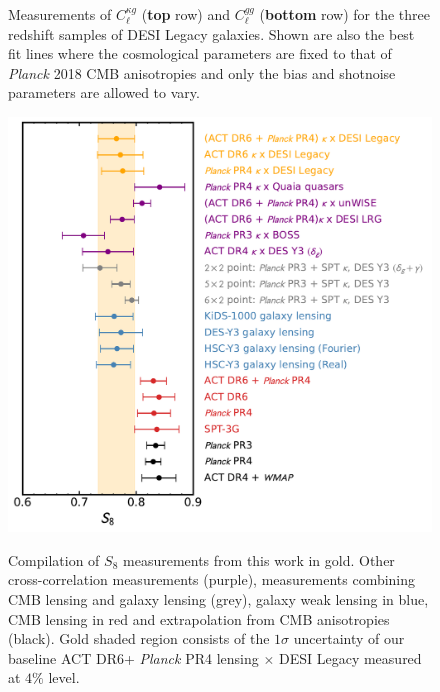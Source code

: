 \documentclass[twocolumn]{aastex631}
\begin{document}
{\begin{figure}
    \caption{Measurements of $C^{\kappa{g}}_\ell$ (\textbf{top} row) and  $C^{gg}_\ell$ (\textbf{bottom} row) for the three redshift samples of DESI Legacy galaxies. Shown are also the best fit lines where the cosmological parameters are fixed to that of \textit{Planck} 2018 CMB anisotropies and only the bias and shotnoise parameters are allowed to vary.
}
    \label{fig:bandpower LCDM fit}
\end{figure}

\begin{figure}
    \centering
    \includegraphics[width=\linewidth]{figures/whisker.pdf} \\ %
    \caption{Compilation of $S_8$ measurements from this work in gold. Other cross-correlation measurements (purple), measurements combining CMB lensing and galaxy lensing (grey), galaxy weak lensing in blue, CMB lensing in red and extrapolation from CMB anisotropies (black). Gold shaded region consists of the $1\sigma$ uncertainty of our baseline ACT DR6+ \textit{Planck} PR4 lensing $\times$ DESI Legacy measured at $4\%$ level.}
    \label{fig: compilation_S8}
\end{figure}




}
\end{document}
